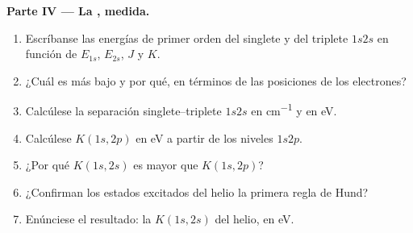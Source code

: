 \begin{problem}
\medskip\noindent\textbf{Parte IV --- La , medida.}
\begin{enumerate}[resume]
  \item Escríbanse las energías de primer orden del singlete y del triplete $1s2s$ en
        función de $E_{1s}$, $E_{2s}$, $J$ y $K$.
  \item ¿Cuál es más bajo y por qué, en términos de las posiciones de los electrones?
  \item Calcúlese la separación singlete--triplete $1s2s$ en \unit{cm^{-1}} y en eV.
  \item Calcúlese $K(1s,2p)$ en eV a partir de los niveles $1s2p$.
  \item ¿Por qué $K(1s,2s)$ es mayor que $K(1s,2p)$?
  \item ¿Confirman los estados excitados del helio la primera regla de Hund?
  \item Enúnciese el resultado: la  $K(1s,2s)$ del helio, en
        eV.
\end{enumerate}
\end{problem}
